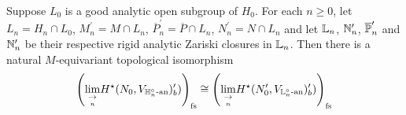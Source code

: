 \documentclass[10pt]{amsart}
\begin{document}
\begin{proposition}
Suppose $L_{0}$ is a good analytic open subgroup of $H_{0}$. For each $n\geq 0$, let $L_{n}=H_{n}\cap L_{0}$, $M_{n}^{\prime} = M\cap L_{n}$, $\overline{P}_{n}^{\prime} = \overline{P}\cap L_{n}$, $N_{n}^{\prime}= N\cap L_{n}$ and let $\L_{n}$, $\n_{n}^{\prime}$, $\overline{\P}_{n}^{\prime}$ and $\n^{\prime}_{n}$ be their respective rigid analytic Zariski closures in $\L_{n}$. Then there is a natural $M$-equivariant topological isomorphism \begin{equation}\label{eqn:inv_of_choice_fs}
    \left(\underset{\underset{n}{\ra}}{\lim}H^{\star}(N_{0},V_{\h_{n}^{\circ}\An})^{\prime}_{b}) \right)_{\textnormal{fs}} \cong \left(\underset{\underset{n}{\ra}}{\lim}H^{\star}(N_{0}^{\prime},V_{\L_{n}^{\circ}\An})^{\prime}_{b}) \right)_{\textnormal{fs}}
\end{equation}
\end{proposition}
\end{document}
